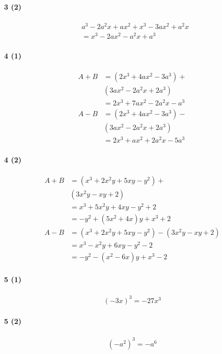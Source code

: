\documentclass[fleqn,a4j,dvipdfmx,uplatex,twocolumn]{jsarticle}
\begin{document}
\paragraph{3 (2)}
\begin{align*}
  & a^{3}-2 a^{2} x+a x^{2}+x^{3}-3 a x^{2}+a^{2} x \\
  &= x^{3}-2 a x^{2}-a^{2} x+a^{3}
\end{align*}

\paragraph{4 (1)}
\begin{align*}
  A+B &= \left(2 x^{3}+4 a x^{2}-3 a^{3}\right)+ \\
  & \left(3 a x^{2}-2 a^{2} x+2 a^{3}\right) \\
  &= 2 x^{3}+7 a x^{2}-2 a^{2} x-a^{3} \\
  A-B &= \left(2 x^{3}+4 a x^{2}-3 a^{3}\right)- \\
  & \left(3 a x^{2}-2 a^{2} x+2 a^{3}\right) \\
  &= 2 x^{3}+a x^{2}+2 a^{2} x-5 a^{3}
\end{align*}

\paragraph{4 (2)}
\begin{align*}
  A+B &= \left(x^{3}+2 x^{2} y+5 x y-y^{2}\right)+ \\
  & \left(3 x^{2} y-x y+2\right) \\
  &= x^{3}+5 x^{2} y+4 x y-y^{2}+2 \\
  &= -y^{2}+\left(5 x^{2}+4 x\right) y+x^{3}+2\\
  A-B &= (x^{3}+2 x^{2} y+5 x y-y^{2})-(3 x^{2} y-x y+2) \\
  &= x^{3}-x^{2} y+6 x y-y^{2}-2 \\
  &= -y^{2}-(x^{2}-6 x) y+x^{3}-2
\end{align*}

\paragraph{5 (1)}
\begin{align*}
  (-3 x)^{3} = -27 x^{3}
\end{align*}

\paragraph{5 (2)}
\begin{align*}
  (-a^{2})^{3} = -a^{6}
\end{align*}
\end{document}
